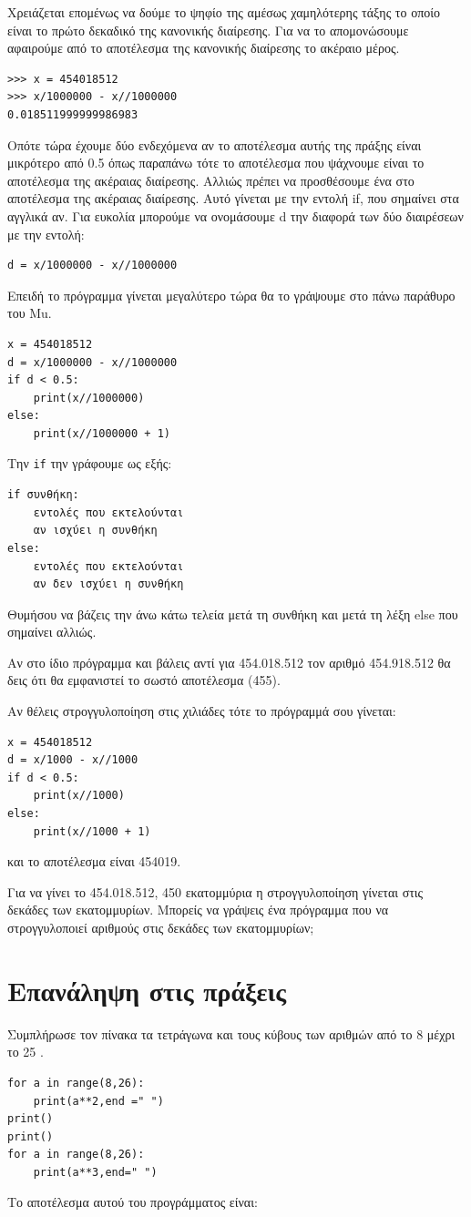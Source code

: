 \documentclass[b5paper,11pt,twoside,openleft]{memoir}
\begin{document}
Χρειάζεται επομένως να δούμε το ψηφίο της αμέσως χαμηλότερης τάξης το οποίο είναι το πρώτο δεκαδικό της κανονικής διαίρεσης. Για να το απομονώσουμε αφαιρούμε από το αποτέλεσμα της κανονικής διαίρεσης το ακέραιο μέρος.
\begin{lstlisting}
>>> x = 454018512
>>> x/1000000 - x//1000000
0.018511999999986983
\end{lstlisting}
Οπότε τώρα έχουμε δύο ενδεχόμενα αν το αποτέλεσμα αυτής της πράξης είναι μικρότερο από 0.5 όπως παραπάνω τότε το αποτέλεσμα που ψάχνουμε είναι το αποτέλεσμα της ακέραιας διαίρεσης. Αλλιώς πρέπει να προσθέσουμε ένα στο αποτέλεσμα της ακέραιας διαίρεσης.
Αυτό γίνεται με την εντολή if, που σημαίνει στα αγγλικά αν. Για ευκολία μπορούμε να ονομάσουμε d την διαφορά των δύο διαιρέσεων με την εντολή:
\begin{lstlisting}
d = x/1000000 - x//1000000
\end{lstlisting}
Επειδή το πρόγραμμα γίνεται μεγαλύτερο τώρα θα το γράψουμε στο πάνω παράθυρο του Mu.
\begin{lstlisting}
x = 454018512
d = x/1000000 - x//1000000
if d < 0.5:
    print(x//1000000)
else:
    print(x//1000000 + 1)
\end{lstlisting}
Την \lstinline{if} την γράφουμε ως εξής:
\begin{lstlisting}
if συνθήκη:
    εντολές που εκτελούνται
    αν ισχύει η συνθήκη
else:
    εντολές που εκτελούνται
    αν δεν ισχύει η συνθήκη
\end{lstlisting}
Θυμήσου να βάζεις την άνω κάτω τελεία μετά τη συνθήκη και μετά τη λέξη else που σημαίνει αλλιώς.

Αν στο ίδιο πρόγραμμα και βάλεις αντί για 454.018.512 τον αριθμό 454.918.512 θα δεις ότι θα εμφανιστεί το σωστό αποτέλεσμα (455).

Αν θέλεις στρογγυλοποίηση στις χιλιάδες τότε το πρόγραμμά σου γίνεται:
\begin{lstlisting}
x = 454018512
d = x/1000 - x//1000
if d < 0.5:
    print(x//1000)
else:
    print(x//1000 + 1)
\end{lstlisting}
και το αποτέλεσμα είναι 454019.

\begin{exercise}
Για να γίνει το 454.018.512, 450 εκατομμύρια  η στρογγυλοποίηση γίνεται στις δεκάδες των εκατομμυρίων. Μπορείς να γράψεις ένα πρόγραμμα που να στρογγυλοποιεί αριθμούς στις δεκάδες των εκατομμυρίων;
\end{exercise}

\section{Επανάληψη στις πράξεις}
\begin{exercise}
Συμπλήρωσε τον πίνακα τα τετράγωνα και τους κύβους των αριθμών από το 8 μέχρι το 25 .
\end{exercise}
\begin{lstlisting}
for a in range(8,26):
    print(a**2,end =" ")
print()
print()
for a in range(8,26):
    print(a**3,end=" ")
\end{lstlisting}
Το αποτέλεσμα αυτού του προγράμματος είναι:
\end{document}
